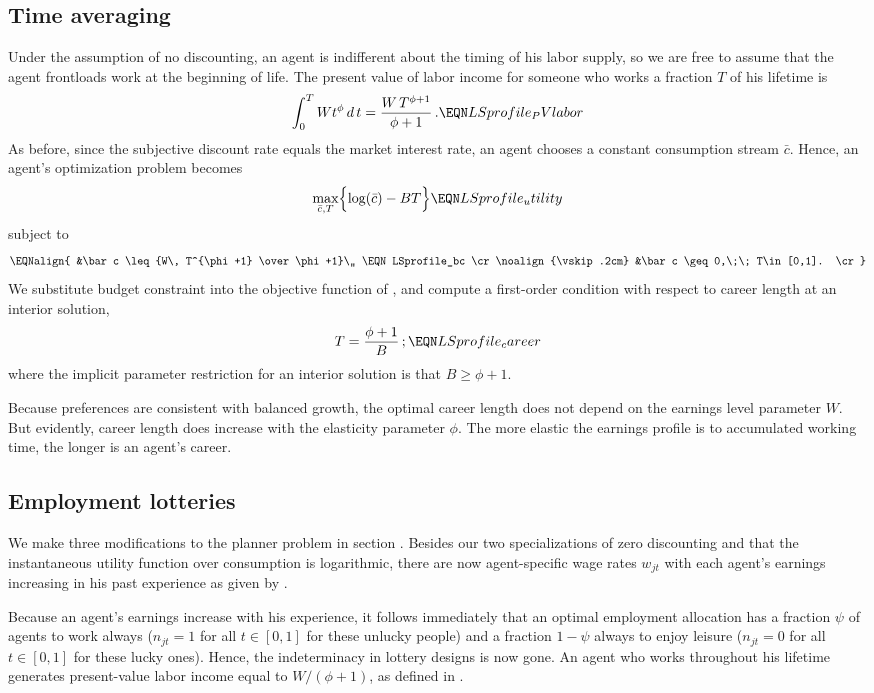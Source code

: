 \subsection{Time averaging}

Under the assumption of no discounting, an agent is indifferent
about the timing of his labor supply, so we are free to assume
that the agent frontloads work at the beginning of life. The
present value of labor income for someone who works a fraction
$T$ of his lifetime is
$$
\int_0^T W t^\phi \, d\, t = {W\,T^{\phi+1} \over \phi+1} \,.
                                                \EQN LSprofile_PVlabor
$$
As before, since the subjective discount rate equals the market
interest rate, an agent chooses a constant consumption stream
$\bar c$. Hence, an agent's optimization problem becomes
$$
\max_{\bar c, T} \Bigl\{ \log(\bar c) - BT \Bigr\} \EQN LSprofile_utility
$$
subject to
$$\EQNalign{
&\bar c \leq {W\, T^{\phi+1} \over \phi+1}\,,        \EQN LSprofile_bc   \cr
\noalign{\vskip.2cm}
&\bar c \geq 0,\;\; T\in[0,1].  \cr}
$$
We substitute budget constraint  into the objective
function of , and
compute a first-order condition with respect to career length at
an interior solution,
$$
T = {\phi +1 \over B}\,;                         \EQN LSprofile_career
$$
where the implicit parameter restriction for an interior
solution is that $B \geq \phi +1$.

Because preferences are consistent with balanced growth, the
optimal career length  does not depend on the
earnings level parameter $W$. But evidently, career length does
increase with the elasticity parameter $\phi$. The more elastic
the earnings profile is to accumulated working time, the longer
is an agent's career.


\subsection{Employment lotteries}

We make three modifications to the planner problem in section
. Besides our two specializations of zero
discounting and that the instantaneous utility function over
consumption is logarithmic, there are now agent-specific
wage rates $w_{jt}$ with each agent's earnings increasing in
his past experience as given by .

Because an agent's earnings increase with his experience, it
follows immediately that an optimal employment allocation has
a fraction $\psi$ of agents to work always ($n_{jt}=1$ for all
$t\in[0,1]$ for these unlucky people) and a fraction $1-\psi$
always to enjoy leisure ($n_{jt}=0$ for all $t\in[0,1]$ for these
lucky ones). Hence, the indeterminacy in lottery designs is now
gone. An agent who works throughout his lifetime generates
present-value labor income equal to $W/(\phi +1)$, as defined
in .

